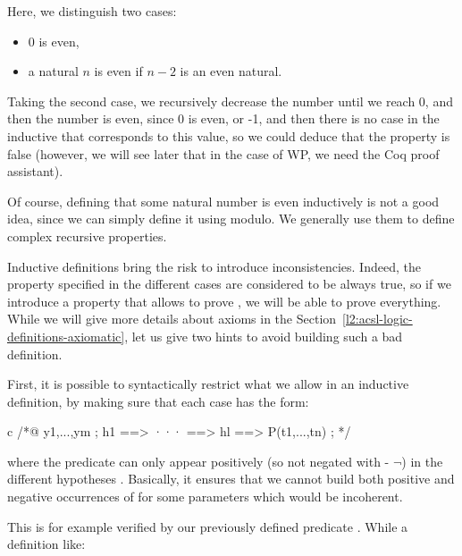 


Here, we distinguish two cases:
\begin{itemize}
\item 0 is even,
\item a natural $n$ is even if $n-2$ is an even natural.
\end{itemize}

Taking the second case, we recursively decrease the number until we reach
0, and then the number is even, since 0 is even, or -1, and then there
is no case in the inductive that corresponds to this value, so we could
deduce that the property is false (however, we will see later that in the
case of WP, we need the Coq proof assistant).





Of course, defining that some natural number is even inductively is not a
good idea, since we can simply define it using modulo. We generally use them
to define complex recursive properties.


Inductive definitions bring the risk to introduce inconsistencies. Indeed, the
property specified in the different cases are considered to be always true, so
if we introduce a property that allows to prove , we will be
able to prove everything. While we will give more details about axioms in the
Section~\ref{l2:acsl-logic-definitions-axiomatic}, let us give two hints to
avoid building such a bad definition.

First, it is possible to syntactically restrict what we allow in an inductive
definition, by making sure that each case has the form:

\begin{CodeBlock}{c}
/*@
  \forall y1,...,ym ; h1 ==> ··· ==> hl ==> P(t1,...,tn) ;
*/
\end{CodeBlock}

where the predicate  can only appear positively (so not negated
with \CodeInline{!} - $\neg$) in the different hypotheses .
Basically, it ensures that we cannot build both positive and negative
occurrences of  for some parameters which would be incoherent.

This is for example verified by our previously defined predicate
. While a definition like:

